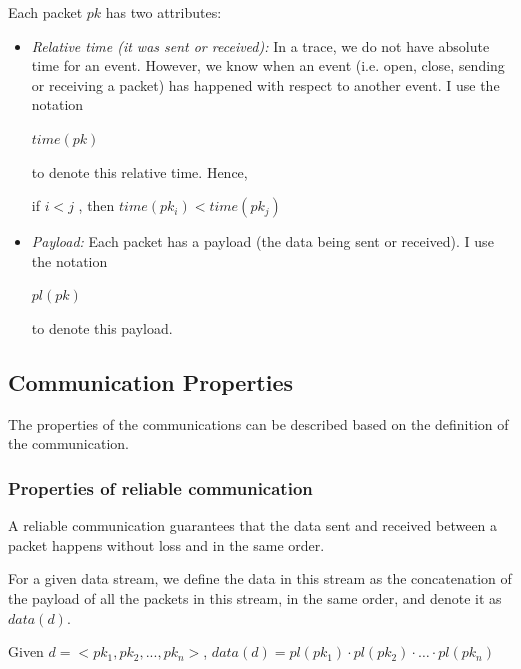 Each packet $pk$ has two attributes:
\begin{itemize}
\item \textit{Relative time (it was sent or received):} In a trace, we do not have absolute time for an event. However, we know when an event (i.e. open, close, sending or receiving a packet) has happened with respect to another event. I use the notation 

$time(pk)$

to denote this relative time. Hence, 

if  $i < j $ , then  $time(pk_i) < time(pk_j)$

\item \textit{Payload:} Each packet has a payload (the data being sent or received). I use the notation 

$pl(pk)$ 

to denote this payload. 

\end{itemize}


\subsection{Communication Properties}\label{properties}
The properties of the communications can be described based on the definition of the communication.

\subsubsection{Properties of reliable communication}\label{reliablepro}
A reliable communication guarantees that the data sent and received between a packet happens without loss and in the same order.

For a given data stream, we define the data in this stream as the concatenation of the payload of all the packets in this stream, in the same order, and denote it as $data(d)$.

Given $ d=<pk_1, pk_2, ..., pk_n>$, $data(d)=pl(pk_1) \cdot pl(pk_2)\cdot \ldots \cdot pl(pk_n)$


